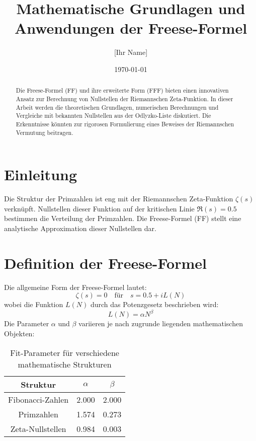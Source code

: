 \documentclass[a4paper,12pt]{article}
\title{Mathematische Grundlagen und Anwendungen der Freese-Formel}
\author{[Ihr Name]}
\date{\today}
\begin{document}
\maketitle

\begin{abstract}
Die Freese-Formel (FF) und ihre erweiterte Form (FFF) bieten einen innovativen Ansatz zur Berechnung von Nullstellen der Riemannschen Zeta-Funktion. In dieser Arbeit werden die theoretischen Grundlagen, numerischen Berechnungen und Vergleiche mit bekannten Nullstellen aus der Odlyzko-Liste diskutiert. Die Erkenntnisse könnten zur rigorosen Formulierung eines Beweises der Riemannschen Vermutung beitragen.
\end{abstract}

\section{Einleitung}
Die Struktur der Primzahlen ist eng mit der Riemannschen Zeta-Funktion \( \zeta(s) \) verknüpft. Nullstellen dieser Funktion auf der kritischen Linie \( \Re(s) = 0.5 \) bestimmen die Verteilung der Primzahlen. Die Freese-Formel (FF) stellt eine analytische Approximation dieser Nullstellen dar.

\section{Definition der Freese-Formel}
Die allgemeine Form der Freese-Formel lautet:
\begin{equation}
    \zeta(s) = 0 \quad \text{für} \quad s = 0.5 + i L(N)
\end{equation}
wobei die Funktion \( L(N) \) durch das Potenzgesetz beschrieben wird:
\begin{equation}
    L(N) = \alpha N^{\beta}
\end{equation}
Die Parameter \( \alpha \) und \( \beta \) variieren je nach zugrunde liegenden mathematischen Objekten:

\begin{table}[h]
\centering
\begin{tabular}{|c|c|c|}
\hline
\textbf{Struktur} & \( \alpha \) & \( \beta \) \\
\hline
Fibonacci-Zahlen & 2.000 & 2.000 \\
Primzahlen & 1.574 & 0.273 \\
Zeta-Nullstellen & 0.984 & 0.003 \\
\hline
\end{tabular}
\caption{Fit-Parameter für verschiedene mathematische Strukturen}
\end{table}
\end{document}
